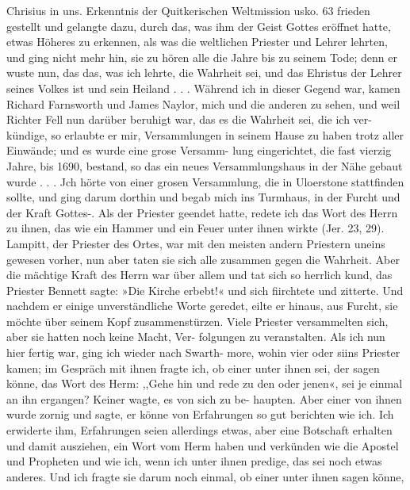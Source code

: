 Chrisius in uns. Erkenntnis der Quitkerischen Weltmission usko. 63
frieden gestellt und gelangte dazu, durch das, was ihm der Geist
Gottes eröffnet hatte, etwas Höheres zu erkennen, als was die
weltlichen Priester und Lehrer lehrten, und ging nicht mehr hin,
sie zu hören alle die Jahre bis zu seinem Tode; denn er wuste
nun, das das, was ich lehrte, die Wahrheit sei, und das Ehristus
der Lehrer seines Volkes ist und sein Heiland . . . Während ich
in dieser Gegend war, kamen Richard Farnsworth und James
Naylor, mich und die anderen zu sehen, und weil Richter Fell
nun darüber beruhigt war, das es die Wahrheit sei, die ich ver-
kündige, so erlaubte er mir, Versammlungen in seinem Hause zu
haben trotz aller Einwände; und es wurde eine grose Versamm-
lung eingerichtet, die fast vierzig Jahre, bis 1690, bestand, so
das ein neues Versammlungshaus in der Nähe gebaut wurde . . .
Jch hörte von einer grosen Versammlung, die in Uloerstone
stattfinden sollte, und ging darum dorthin und begab mich ins
Turmhaus, in der Furcht und der Kraft Gottes-. Als der Priester
geendet hatte, redete ich das Wort des Herrn zu ihnen, das wie ein
Hammer und ein Feuer unter ihnen wirkte (Jer. 23, 29). Lampitt,
der Priester des Ortes, war mit den meisten andern Priestern
uneins gewesen vorher, nun aber taten sie sich alle zusammen
gegen die Wahrheit. Aber die mächtige Kraft des Herrn war
über allem und tat sich so herrlich kund, das Priester Bennett
sagte: »Die Kirche erbebt!« und sich fiirchtete und zitterte. Und
nachdem er einige unverständliche Worte geredet, eilte er hinaus,
aus Furcht, sie möchte über seinem Kopf zusammenstürzen. Viele
Priester versammelten sich, aber sie hatten noch keine Macht, Ver-
folgungen zu veranstalten.
Als ich nun hier fertig war, ging ich wieder nach Swarth-
more, wohin vier oder siins Priester kamen; im Gespräch mit
ihnen fragte ich, ob einer unter ihnen sei, der sagen könne, das
Wort des Herm: ,,Gehe hin und rede zu den oder jenen«, sei je
einmal an ihn ergangen? Keiner wagte, es von sich zu be-
haupten. Aber einer von ihnen wurde zornig und sagte, er
könne von Erfahrungen so gut berichten wie ich. Ich erwiderte
ihm, Erfahrungen seien allerdings etwas, aber eine Botschaft
erhalten und damit ausziehen, ein Wort vom Herm haben und
verkünden wie die Apostel und Propheten und wie ich, wenn
ich unter ihnen predige, das sei noch etwas anderes. Und ich
fragte sie darum noch einmal, ob einer unter ihnen sagen könne,


